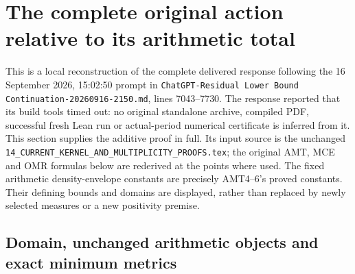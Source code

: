 \clearpage
\begingroup
\providecommand{\im}{\operatorname{im}}
\providecommand{\rank}{\operatorname{rank}}
\section{The complete original action relative to its arithmetic total}
\label{sec:complete-action-integration}

This is a local reconstruction of the complete delivered response following
the 16 September 2026, 15:02:50 prompt in
\texttt{ChatGPT-Residual Lower Bound Continuation-20260916-2150.md},
lines 7043--7730. The response reported that its build tools timed out:
no original standalone archive, compiled PDF, successful fresh Lean run or
actual-period numerical certificate is inferred from it. This section
supplies the additive proof in full. Its input source is the unchanged
\texttt{14\_CURRENT\_KERNEL\_AND\_MULTIPLICITY\_PROOFS.tex}; the original
AMT, MCE and OMR formulas below are rederived at the points where used.
The fixed arithmetic density-envelope constants are precisely AMT4--6's
proved constants. Their defining bounds and domains are displayed, rather
than replaced by newly selected measures or a new positivity premise.

\subsection{Domain, unchanged arithmetic objects and exact minimum metrics}

